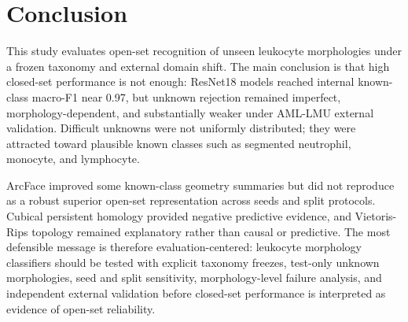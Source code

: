 \section{Conclusion}

This study evaluates open-set recognition of unseen leukocyte morphologies under a frozen taxonomy and external domain shift. The main conclusion is that high closed-set performance is not enough: ResNet18 models reached internal known-class macro-F1 near 0.97, but unknown rejection remained imperfect, morphology-dependent, and substantially weaker under AML-LMU external validation. Difficult unknowns were not uniformly distributed; they were attracted toward plausible known classes such as segmented neutrophil, monocyte, and lymphocyte.

ArcFace improved some known-class geometry summaries but did not reproduce as a robust superior open-set representation across seeds and split protocols. Cubical persistent homology provided negative predictive evidence, and Vietoris-Rips topology remained explanatory rather than causal or predictive. The most defensible message is therefore evaluation-centered: leukocyte morphology classifiers should be tested with explicit taxonomy freezes, test-only unknown morphologies, seed and split sensitivity, morphology-level failure analysis, and independent external validation before closed-set performance is interpreted as evidence of open-set reliability.
